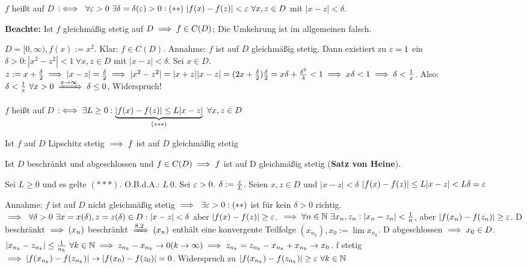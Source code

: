 \documentclass[a4paper,oneside,DIV15,BCOR12mm]{scrbook}
\begin{document}
\begin{definition}
$f$ heißt auf $D$  $:\iff\ \forall \varepsilon>0\ \exists \delta=\delta(\varepsilon)>0: (**)\ |f(x)-f(z)| < \varepsilon\ \forall x,z \in D$ mit $|x-z|<\delta.$
\end{definition}

\textbf{Beachte:} Ist $f$ gleichmäßig stetig auf $D \implies f \in C(D)$; Die Umkehrung ist im allgemeinen falsch.

\begin{beispiel}
$D=[0, \infty), f(x):=x^2$. Klar: $f \in C(D)$. Annahme: $f$ ist auf $D$ gleichmäßig stetig. Dann existiert zu $\varepsilon=1$ ein $\delta>0: |x^2-z^2|<1\ \forall x,z \in D$ mit $|x-z|<\delta$. Sei $x \in D$. $z:=x+\frac{\delta}{2} \implies |x-z|=\frac{\delta}{2} \implies |x^2-z^2|=|x+z||x-z|=(2x + \frac{\delta}{2})\frac{\delta}{2}=x\delta + \frac{\delta^2}{4}<1 \implies x\delta<1 \implies \delta<\frac{1}{x}$. Also: $\delta<\frac{1}{x}\ \forall x>0 \folgtwegen{x\to\infty} \delta \le 0$, Widerspruch!
\end{beispiel}

\begin{definition}
$f$ heißt auf $D$  $:\iff \exists L\ge 0: \underbrace{|f(x)-f(z)|\le L|x-z|}_{(***)}\ \forall x,z \in D$
\end{definition}

\begin{satz}[Stetigkeitsstätze]
\begin{liste}
\item Ist $f$ auf $D$ Lipschitz stetig $\implies f$ ist auf $D$ gleichmäßig stetig
\item Ist $D$ beschränkt und abgeschlossen und $f\in C(D) \implies f$ ist auf D gleichmäßig stetig (\textbf{Satz von Heine}).
\end{liste}
\end{satz}

\begin{beweise}
\item Sei $L\ge 0$ und es gelte $(***)$. O.B.d.A.: $L\> 0$. Sei $\varepsilon>0$. $\delta:=\frac{\varepsilon}{L}$. Seien $x, z \in D$ und $|x-z|<\delta$ \folgt $|f(x)-f(z)| \le L|x-z|<L\delta=\varepsilon$
\item Annahme: $f$ ist auf $D$ nicht gleichmäßig stetig $\implies \ \exists \varepsilon>0: (**)$ ist für kein $\delta>0$ richtig. $\implies \ \forall\delta>0\ \exists x=x(\delta),z=z(\delta) \in D: |x-z|<\delta$ aber $|f(x)-f(z)|\ge \varepsilon$. $\implies \forall n \in \mathbb{N}\ \exists x_n, z_n: |x_n-z_n|<\frac{1}{n}$, aber $|f(x_n)-f(z_n)| \ge \varepsilon$. D beschränkt $\implies (x_n)$ beschränkt $\folgtnach{8.2} (x_n) $ enthält eine konvergente Teilfolge $(x_{n_k}), x_0:=\lim x_{n_k}$. D abgeschlossen $\implies x_0 \in D$. $|x_{n_k}-z_{n_k}| \le \frac{1}{n_k}\ \forall k \in \mathbb{N} \implies z_{n_k} - x_{n_k} \to 0 (k \to \infty) \implies z_{n_k} = z_{n_k} - x_{n_k} + x_{n_k} \to x_0$. f stetig $\implies |f(x_{n_k})-f(z_{n_k})| \to |f(x_0)-f(z_0)|=0$. Widerspruch zu $|f(x_{n_k})-f(z_{n_k})|\ge \varepsilon \ \forall k \in \mathbb{N}$
\end{beweise}
\end{document}
